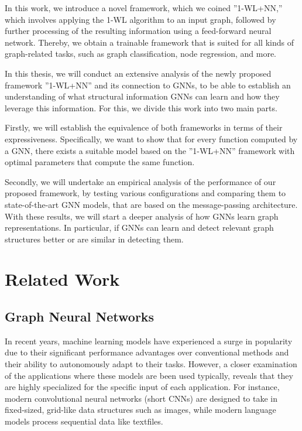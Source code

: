 \documentclass[11pt, dvipsnames, DIV=12]{scrreprt}
\theoremstyle{definition}
\begin{document}
In this work, we introduce a novel framework, which we coined ''1-WL+NN,'' which involves applying the 1-WL algorithm to an input graph, followed by further processing of the resulting information using a feed-forward neural network. Thereby, we obtain a trainable framework that is suited for all kinds of graph-related tasks, such as graph classification, node regression, and more.

In this thesis, we will conduct an extensive analysis of the newly proposed framework ''1-WL+NN'' and its connection to GNNs, to be able to establish an understanding of what structural information GNNs can learn and how they leverage this information. For this, we divide this work into two main parts.

Firstly, we will establish the equivalence of both frameworks in terms of their expressiveness. Specifically, we want to show that for every function computed by a GNN, there exists a suitable model based on the ''1-WL+NN'' framework with optimal parameters that compute the same function.

Secondly, we will undertake an empirical analysis of the performance of our proposed framework, by testing various configurations and comparing them to state-of-the-art GNN models, that are based on the message-passing architecture. With these results, we will start a deeper analysis of how GNNs learn graph representations. In particular, if GNNs can learn and detect relevant graph structures better or are similar in detecting them.  

\section{Related Work}
\subsection{Graph Neural Networks}
In recent years, machine learning models have experienced a surge in popularity due to their significant performance advantages over conventional methods and their ability to autonomously adapt to their tasks. However, a closer examination of the applications where these models are been used typically, reveals that they are highly specialized for the specific input of each application. For instance, modern convolutional neural networks (short CNNs) are designed to take in fixed-sized, grid-like data structures such as images, while modern language models process sequential data like textfiles.
\end{document}
